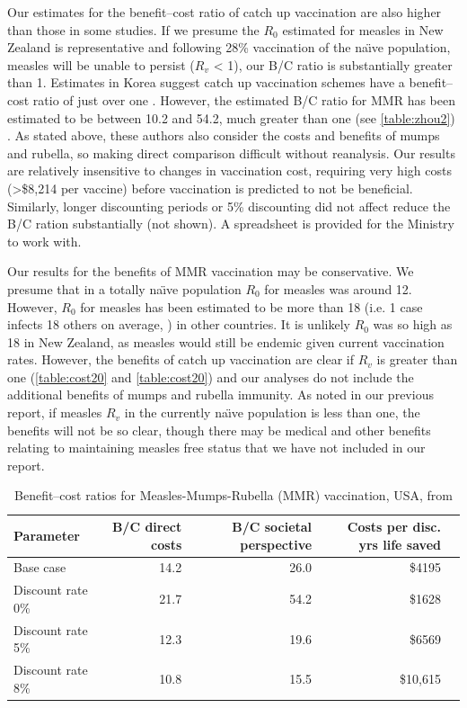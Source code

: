 \documentclass{article}
\begin{document}
Our estimates for the benefit--cost ratio of catch up vaccination are also higher than those in some studies. If we presume the $R_0$ estimated for measles in New Zealand is representative and following 28\% vaccination of the na\"{\i}ve population, measles will be unable to persist ($R_v$ < 1), our B/C ratio is substantially greater than 1. Estimates in Korea suggest catch up vaccination schemes have a benefit--cost ratio of just over one \citep{bae13}. However,  the estimated B/C ratio for MMR has been estimated to be between 10.2 and 54.2, much greater than one (see \autoref{table:zhou2}) \citep{zhou4}. As stated above, these authors also consider the costs and benefits of mumps and rubella, so making direct comparison difficult without reanalysis. Our results are relatively insensitive to changes in vaccination cost, requiring very high costs (>\$8,214 per vaccine) before vaccination is predicted to not be beneficial. Similarly, longer discounting periods or 5\% discounting did not affect reduce the B/C ration substantially (not shown). A spreadsheet is provided for the Ministry to work with.

Our results for the benefits of MMR vaccination may be conservative. We presume that in a totally na\"{\i}ve population $R_0$ for measles was around 12. However, $R_0$ for measles has been estimated to be more than 18 (i.e. 1 case infects 18 others on average, \citep{anderson91}) in other countries. It is unlikely $R_0$ was so high as 18 in New Zealand, as measles would still be endemic given current vaccination rates. However, the benefits of catch up vaccination are clear if $R_v$ is greater than one (\autoref{table:cost20} and \autoref{table:cost20}) and our analyses do not include the additional benefits of mumps and rubella immunity. As noted in our previous report, if measles $R_v$ in the currently na\"{\i}ve population is less than one, the benefits will not be so clear, though there may be medical and other benefits relating to maintaining measles free status that we have not included in our report.

\begin{table}
\begin{center}
\begin{tabular}{lrrrr}
\hline
Parameter & B/C direct costs & B/C societal perspective & Costs per disc. yrs life saved\\
\hline
Base case & 14.2 & 26.0 & \$4195 \\
Discount rate 0\% & 21.7 & 54.2 & \$1628 \\
Discount rate 5\% & 12.3 & 19.6 & \$6569 \\
Discount rate 8\% & 10.8 & 15.5 & \$10,615 \\
\hline
\end{tabular}
\end{center}
\caption{Benefit--cost ratios for Measles-Mumps-Rubella (MMR) vaccination, USA, from \citep{zhou4}}
\label{table:zhou2}
\end{table}%
\end{document}
